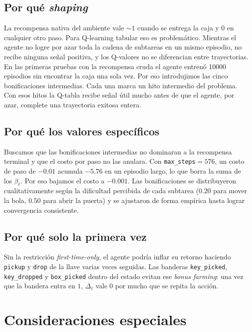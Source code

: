 \documentclass[11pt,a4paper]{article}
\begin{document}
\subsection{Por qué \emph{shaping}}

La recompensa nativa del ambiente vale \(\sim 1\) cuando se entrega la caja
y \(0\) en cualquier otro paso. Para Q-learning tabular \cite{watkins} eso
es problemático.
Mientras el agente no logre por azar toda la cadena de subtareas en un
mismo episodio, no recibe ninguna señal positiva, y los Q-valores no se
diferencian entre trayectorias. En las primeras pruebas con la recompensa
cruda el agente entrenó \num{10000} episodios sin encontrar la caja una sola
vez. Por eso introdujimos las cinco bonificaciones intermedias. Cada una marca
un hito intermedio del problema. Con esos hitos la Q-tabla recibe señal
útil mucho antes de que el agente, por azar, complete una trayectoria
exitosa entera.

\subsection{Por qué los valores específicos}

Buscamos que las bonificaciones intermedias no dominaran a la recompensa
terminal y que el costo por paso no las anulara. Con
\texttt{max\_steps}\(=576\), un costo de paso de \(-0.01\) acumula
\(-5.76\) en un episodio largo, lo que borra la suma de los \(\beta_\ell\).
Por eso bajamos el costo a \(-0.001\). Las bonificaciones se distribuyeron
cualitativamente según la dificultad percibida de cada subtarea (\(0.20\)
para mover la bola, \(0.50\) para abrir la puerta) y se ajustaron de forma
empírica hasta lograr convergencia consistente.

\subsection{Por qué solo la primera vez}

Sin la restricción \emph{first-time-only}, el agente podría inflar su
retorno haciendo \texttt{pickup} y \texttt{drop} de la llave varias veces
seguidas. Las banderas \texttt{key\_picked}, \texttt{key\_dropped} y
\texttt{box\_picked} dentro del estado evitan ese \emph{bonus farming}: una
vez que la bandera entra en \(1\), \(\Delta_\ell\) vale \(0\) por mucho que
se repita la acción.

\section{Consideraciones especiales}
\label{sec:obs}
\end{document}
